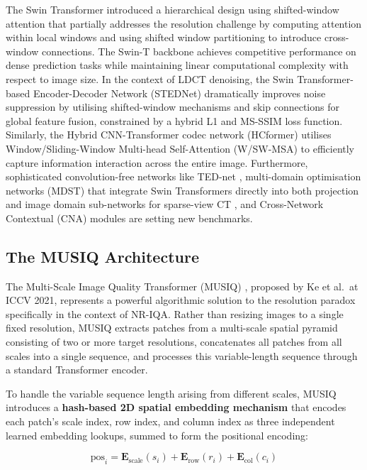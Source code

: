 The Swin Transformer introduced a hierarchical design using shifted-window attention that
partially addresses the resolution challenge by computing attention within local windows
and using shifted window partitioning to introduce cross-window connections. The
Swin-T backbone achieves competitive performance on dense prediction tasks while
maintaining linear computational complexity with respect to image size. In the context of
LDCT denoising, the Swin Transformer-based Encoder-Decoder Network (STEDNet) \cite{zhu2023stednet}
dramatically improves noise suppression by utilising shifted-window mechanisms and skip
connections for global feature fusion, constrained by a hybrid L1 and MS-SSIM loss
function. Similarly, the Hybrid CNN-Transformer codec network (HCformer) \cite{luo2025hcformer}
utilises Window/Sliding-Window Multi-head Self-Attention (W/SW-MSA) to efficiently
capture information interaction across the entire image. Furthermore, sophisticated
convolution-free networks like TED-net \cite{fan2021interpretability}, multi-domain
optimisation networks (MDST) that integrate Swin Transformers directly into both
projection and image domain sub-networks for sparse-view CT \cite{li2023mdst}, and
Cross-Network Contextual (CNA) modules \cite{zhang2021convergent} are setting new
benchmarks.

\subsection{The MUSIQ Architecture}
\label{subsec:musiq}

The Multi-Scale Image Quality Transformer (MUSIQ) \cite{ke2021musiq}, proposed by Ke
et al.\ at ICCV 2021, represents a powerful algorithmic solution to the resolution
paradox specifically in the context of NR-IQA. Rather than resizing images to a single
fixed resolution, MUSIQ extracts patches from a multi-scale spatial pyramid consisting of
two or more target resolutions, concatenates all patches from all scales into a single
sequence, and processes this variable-length sequence through a standard Transformer
encoder.

To handle the variable sequence length arising from different scales, MUSIQ introduces a
\textbf{hash-based 2D spatial embedding mechanism} that encodes each patch's scale index,
row index, and column index as three independent learned embedding lookups, summed to form
the positional encoding:

\begin{equation}
    \text{pos}_{i} = \mathbf{E}_{\text{scale}}(s_i) + \mathbf{E}_{\text{row}}(r_i) + \mathbf{E}_{\text{col}}(c_i)
\end{equation}

